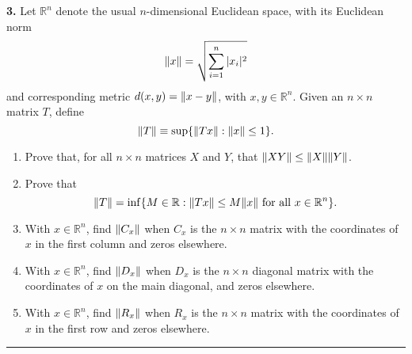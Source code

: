 \documentclass{article}
\begin{document}
\noindent \textbf{3.} Let $\mathbb{R}^n$ denote the usual $n$-dimensional Euclidean space,   with its Euclidean  norm
$$ \norm{x} = \sqrt{ \sum_{i=1}^n |x_i|^2}$$ and corresponding metric $d(x,y) = \norm{x-y}$,  with    $ x,y \in \mathbb{R}^n$.
Given an $n \times n$ matrix $T$,  define 
$$ \norm{T} \equiv \sup  \{ \norm{Tx} : \norm{x} \leq 1\} .$$

\begin{enumerate}
	\item  Prove that,   for all $n \times n$ matrices $X$ and $Y$,  that $\norm{XY} \leq \norm{X}  \norm{Y}$.
	\item  Prove that
	$$ \norm{T}=  \inf  \{ M \in \mathbb{R} : \norm{T x } \leq M \norm{ x }   \mbox{ for all } x \in \mathbb{R}^n \}. $$
	\item  With $x \in \mathbb{R}^n$,   find $ \norm{C_x} $ when $C_x$ is the $n \times n$ matrix with the coordinates of $x$ in the first column and zeros elsewhere.
	\item   With $x \in \mathbb{R}^n$,   find $ \norm{D_x} $ when $D_x$ is the $n \times n$ diagonal matrix with the coordinates of  $x$  on the main diagonal,
	and zeros elsewhere.
	\item  With $x \in \mathbb{R}^n$,   find $ \norm{R_x} $ when $R_x$ is the $n \times n$ matrix with the coordinates of $x$ in the first row and zeros elsewhere.
	
\end{enumerate}

\hrule
\end{document}
